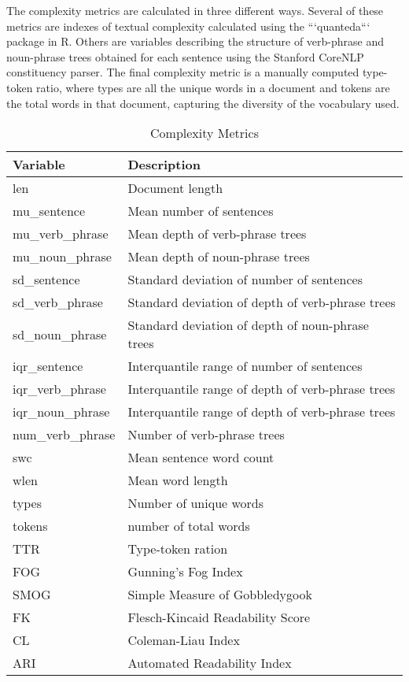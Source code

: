 \documentclass[../thesis.tex]{subfiles}
\begin{document}
The complexity metrics are calculated in three different ways. Several of these metrics are indexes of textual complexity calculated using the ```quanteda``` package in R. Others are variables describing the structure of verb-phrase and noun-phrase trees obtained for each sentence using the Stanford CoreNLP constituency parser. The final complexity metric is a manually computed type-token ratio, where types are all the unique words in a document and tokens are the total words in that document, capturing the diversity of the vocabulary used.

\begin{longtable}[t]{ll}
\caption{\label{tab:}Complexity Metrics}\\
\toprule
Variable & Description\\
\midrule
len & Document length \\
mu\_sentence & Mean number of sentences\\
mu\_verb\_phrase & Mean depth of verb-phrase trees\\
mu\_noun\_phrase & Mean depth of noun-phrase trees\\
sd\_sentence & Standard deviation of number of sentences\\
sd\_verb\_phrase & Standard deviation of depth of verb-phrase trees\\
\addlinespace
sd\_noun\_phrase & Standard deviation of depth of noun-phrase trees\\
iqr\_sentence & Interquantile range of number of sentences\\
iqr\_verb\_phrase & Interquantile range of depth of verb-phrase trees\\
iqr\_noun\_phrase & Interquantile range of depth of verb-phrase trees\\
num\_verb\_phrase & Number of verb-phrase trees\\
\addlinespace
swc & Mean sentence word count\\
wlen & Mean word length\\
types & Number of unique words\\
tokens & number of total words\\
TTR & Type-token ration\\
\addlinespace
FOG & Gunning's Fog Index\\
SMOG & Simple Measure of Gobbledygook\\
FK & Flesch-Kincaid Readability Score\\
CL & Coleman-Liau Index\\
ARI & Automated Readability Index\\
\bottomrule
\end{longtable}
\end{document}

